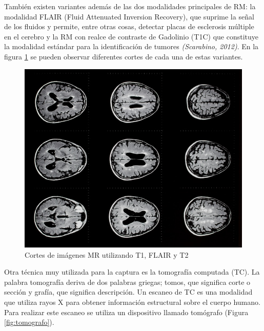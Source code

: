 También existen variantes además de las dos modalidades principales de RM: la modalidad FLAIR (Fluid Attenuated Inversion Recovery), que suprime la señal de los fluidos y permite, entre otras cosas, detectar placas de esclerosis múltiple en el cerebro y la RM con realce de contraste de Gadolinio (T1C) que constituye la modalidad estándar para la identificación de tumores \emph{(Scarabino, 2012)}. En la figura \ref{fig:mri_cortes} se pueden observar diferentes cortes de cada una de estas variantes.

\begin{figure}[h!]
\centering
\includegraphics[scale=1]{images/mri-ms-brain-scan.jpg}
\caption{Cortes de imágenes MR utilizando T1, FLAIR y T2}
\label{fig:mri_cortes}
\end{figure}

Otra técnica muy utilizada para la captura es la tomografía computada (TC). La palabra tomografía deriva de dos palabras griegas; tomos, que significa corte o sección y grafía, que significa descripción. Un escaneo de TC es una modalidad que utiliza rayos X para obtener información estructural sobre el cuerpo humano. Para realizar este escaneo se utiliza un dispositivo llamado tomógrafo (Figura \ref{fig:tomografo}).


